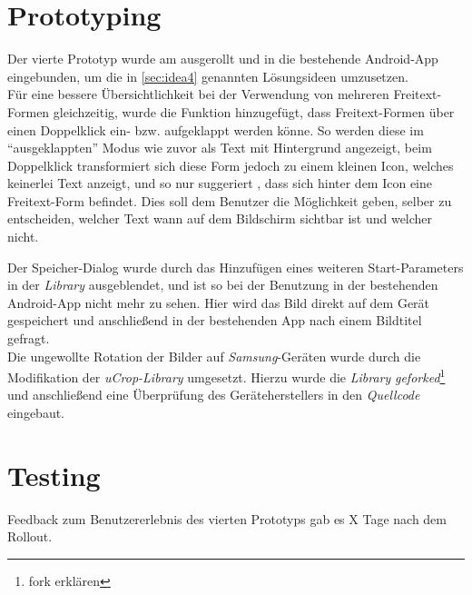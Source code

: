 \section{Prototyping}
Der vierte Prototyp wurde am  ausgerollt und in die bestehende Android-App eingebunden, um die in \autoref{sec:idea4} genannten Lösungsideen umzusetzen. \\

Für eine bessere Übersichtlichkeit bei der Verwendung von mehreren Freitext-Formen gleichzeitig, wurde die Funktion hinzugefügt, dass Freitext-Formen über einen Doppelklick ein- bzw. aufgeklappt werden könne.
So werden diese im ``ausgeklappten'' Modus wie zuvor als Text mit Hintergrund angezeigt, beim Doppelklick transformiert sich diese Form jedoch zu einem kleinen Icon, welches keinerlei Text anzeigt, und so nur suggeriert , dass sich hinter dem Icon eine Freitext-Form befindet. 
Dies soll dem Benutzer die Möglichkeit geben, selber zu entscheiden, welcher Text wann auf dem Bildschirm sichtbar ist und welcher nicht. \\

Der Speicher-Dialog wurde durch das Hinzufügen eines weiteren Start-Parameters in der \emph{Library} ausgeblendet, und ist so bei der Benutzung in der bestehenden Android-App nicht mehr zu sehen.
Hier wird das Bild direkt auf dem Gerät gespeichert und anschließend in der bestehenden App nach einem Bildtitel gefragt. \\

Die ungewollte Rotation der Bilder auf \emph{Samsung}-Geräten wurde durch die Modifikation der \emph{uCrop-Library} umgesetzt.
Hierzu wurde die \emph{Library} \emph{geforked}\footnote{fork erklären} und anschließend eine Überprüfung des Geräteherstellers in den \emph{Quellcode} eingebaut.

\section{Testing}
Feedback zum Benutzererlebnis des vierten Prototyps gab es X Tage nach dem Rollout. \\

